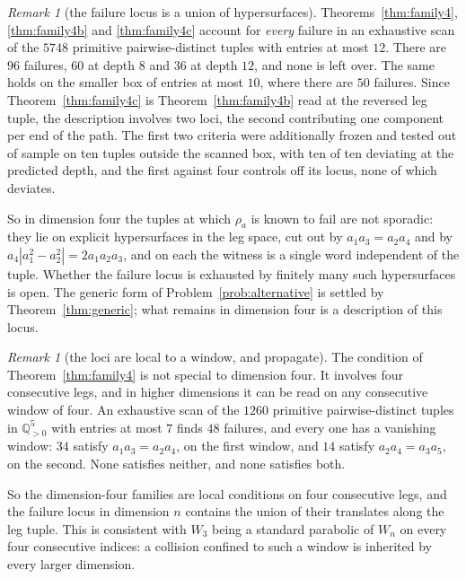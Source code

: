 \documentclass[11pt]{article}
\theoremstyle{definition}
\theoremstyle{remark}
\newtheorem{remark}[theorem]{Remark}
\theoremstyle{definition}
\newcommand{\Q}{\mathbb{Q}}
\begin{document}
\begin{remark}[the failure locus is a union of hypersurfaces]\label{rem:hypersurfaces}
Theorems~\ref{thm:family4}, \ref{thm:family4b} and \ref{thm:family4c} account for
\emph{every} failure in an exhaustive scan of the $5748$ primitive pairwise-distinct tuples with
entries at most $12$. There are $96$ failures, $60$ at depth $8$ and $36$ at depth $12$, and
none is left over. The same holds on the smaller box of entries at most $10$, where there are
$50$ failures. Since Theorem~\ref{thm:family4c} is Theorem~\ref{thm:family4b} read at the
reversed leg tuple, the description involves two loci, the second contributing one component per
end of the path. The first two criteria
were additionally frozen and tested out of sample on ten tuples outside the scanned box, with ten
of ten deviating at the predicted depth, and the first against four controls off its locus, none
of which deviates.

So in dimension four the tuples at which $\rho_a$ is known to fail are not sporadic: they lie on
explicit hypersurfaces in the leg space, cut out by $a_1a_3=a_2a_4$ and by
$a_4|a_1^2-a_2^2|=2a_1a_2a_3$, and on each the witness is a single word independent of the tuple.
Whether the failure locus is exhausted by finitely many such hypersurfaces is open. The generic
form of Problem~\textup{\ref{prob:alternative}} is settled by Theorem~\ref{thm:generic}; what
remains in dimension four is a description of this locus.
\end{remark}

\begin{remark}[the loci are local to a window, and propagate]\label{rem:windows}
The condition of Theorem~\ref{thm:family4} is not special to dimension four. It involves four
consecutive legs, and in higher dimensions it can be read on any consecutive window of four. An
exhaustive scan of the $1260$ primitive pairwise-distinct tuples in $\Q_{>0}^5$ with entries at
most $7$ finds $48$ failures, and every one has a vanishing window: $34$ satisfy
$a_1a_3=a_2a_4$, on the first window, and $14$ satisfy $a_2a_4=a_3a_5$, on the second. None
satisfies neither, and none satisfies both.

So the dimension-four families are local conditions on four consecutive legs, and the failure
locus in dimension $n$ contains the union of their translates along the leg tuple. This is
consistent with $W_3$ being a standard parabolic of $W_n$ on every four consecutive indices: a
collision confined to such a window is inherited by every larger dimension.
\end{remark}
\end{document}
